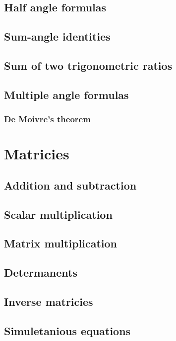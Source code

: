 \documentclass{book}
\begin{document}
\section{Half angle formulas}

\section{Sum-angle identities}

\section{Sum of two trigonometric ratios}

\section{Multiple angle formulas}
\subsection{De Moivre's theorem}

\chapter{Matricies}
\section{Addition and subtraction}

\section{Scalar multiplication}

\section{Matrix multiplication}

\section{Determanents}

\section{Inverse matricies}

\section{Simuletanious equations}
\end{document}
